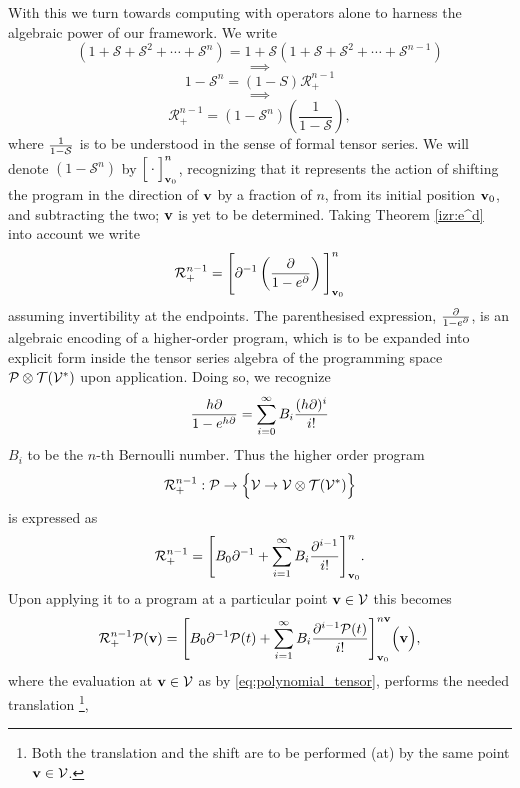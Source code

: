 With this we turn towards computing with operators alone to harness the algebraic power of our framework. We write
$$(1+\mathcal{S}+\mathcal{S}^2+\cdots+\mathcal{S}^n)=1+\mathcal{S}(1+\mathcal{S}+\mathcal{S}^2+\cdots+\mathcal{S}^{n-1})$$
   $$\implies$$
   $$1-\mathcal{S}^n=\left(1-S\right)\mathcal{R}^{n-1}_+$$
   $$\implies$$
  \begin{equation}
\mathcal{R}^{n-1}_+=\left(1-\mathcal{S}^n\right)\left(\frac{1}{1-\mathcal{S}}\right),
  \end{equation}
where $\frac{1}{1-\mathcal{S}}$ is to be understood in the sense of formal tensor series. We will denote $(1-\mathcal{S}^n)$ by $\Big[\cdot\Big]^n_{\mathbf{v}_0}$, recognizing that it represents the action of shifting the program in the direction of $\mathbf{v}$ by a fraction of $n$, from its initial position $\mathbf{v}_0$, and subtracting the two; $\mathbf{v}$ is yet to be determined. Taking Theorem \ref{izr:e^d} into account we write
  \begin{equation}\label{eq:Rn+Basic}
    \mathcal{R}^{n-1}_+=\Bigg[\partial^{-1}\left(\frac{\partial}{1-e^\partial}\right)\Bigg]^n_{\mathbf{v}_0}
  \end{equation}
assuming invertibility at the endpoints. The parenthesised expression, $\frac{\partial}{1-e^\partial}$, is an algebraic encoding of a higher-order program, which is to be expanded into explicit form inside the tensor series algebra of the programming space $\mathcal{P}\otimes \mathcal{T}(\mathcal{V}^*)$ upon application. Doing so, we recognize
\begin{equation}
    	\frac{h\partial}{1-e^{h\partial}}=\sum\limits_{i=0}^{\infty}B_i\frac{(h\partial)^i}{i!}
    \end{equation}
$B_i$ to be the $n$-th Bernoulli number. Thus the higher order program
$$\mathcal{R}^{n-1}_+:\mathcal{P}\to\Big\{\mathcal{V}\to \mathcal{V}\otimes \mathcal{T}(\mathcal{V}^*)\Big\}$$
is expressed as 
    \begin{equation}\label{eq:Rn+}
      \mathcal{R}^{n-1}_+=\Bigg[B_0\partial^{-1}+\sum\limits_{i=1}^{\infty}B_i\frac{\partial^{i-1}}{i!}\Bigg]_{\mathbf{v}_0}^{n}.
    \end{equation}
Upon applying it to a program at a particular point $\mathbf{v}\in \mathcal{V}$ this becomes
\begin{equation}\label{eq:Rn+P}
  \mathcal{R}^{n-1}_+\mathcal{P}(\mathbf{v})=\Bigg[B_0\partial^{-1}\mathcal{P}(t)+\sum\limits_{i=1}^{\infty}B_i\frac{\partial^{i-1}\mathcal{P}(t)}{i!}\Bigg]_{\mathbf{v}_0}^{n\mathbf{v}} \Big(\mathbf{v}\Big),
    \end{equation}
where the evaluation at $\mathbf{v}\in \mathcal{V}$ as by \eqref{eq:polynomial_tensor}, performs the needed translation
\footnote{Both the translation and the shift are to be performed (at) by the same point $\mathbf{v}\in\mathcal{V}$.},
